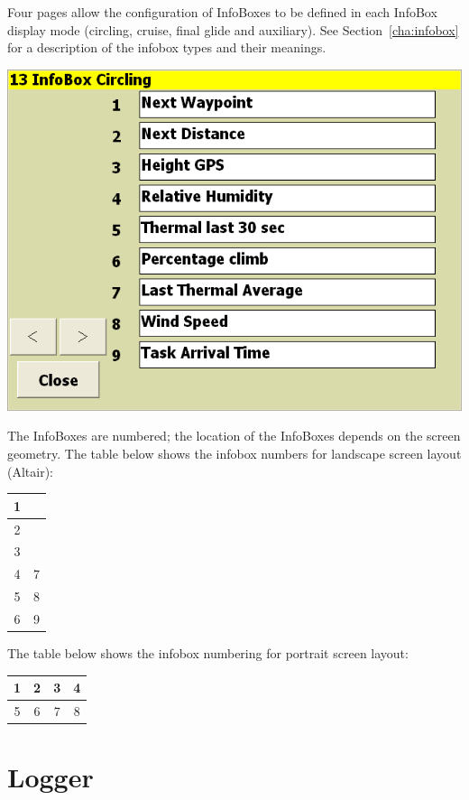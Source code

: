 \documentclass[a4paper,12pt]{refrep}
\begin{document}
Four pages allow the configuration of InfoBoxes to be defined in each
InfoBox display mode (circling, cruise, final glide and auxiliary).  See
Section~\ref{cha:infobox} for a description of the infobox types and
their meanings.

\begin{center}
\includegraphics[angle=0,width=\linewidth,keepaspectratio='true']{figures/config-13.png}
\end{center}

The InfoBoxes are numbered; the location of the InfoBoxes depends on
the screen geometry.  The table below shows the infobox numbers for
landscape screen layout (Altair):

\begin{tabular}{|c|c|}
\hline
1 &  \\
\hline
2 &  \\
\hline
3 &  \\
\hline
4 & 7 \\
\hline
5 & 8 \\
\hline
6 & 9 \\
\hline
\end{tabular}

The table below shows the infobox numbering for portrait screen layout:

\begin{tabular}{|c|c|c|c|}
\hline
1 & 2 & 3 & 4 \\
\hline
\hline
5 & 6 & 7 & 8 \\
\hline
\end{tabular}

\clearpage
\section{Logger}
\end{document}

